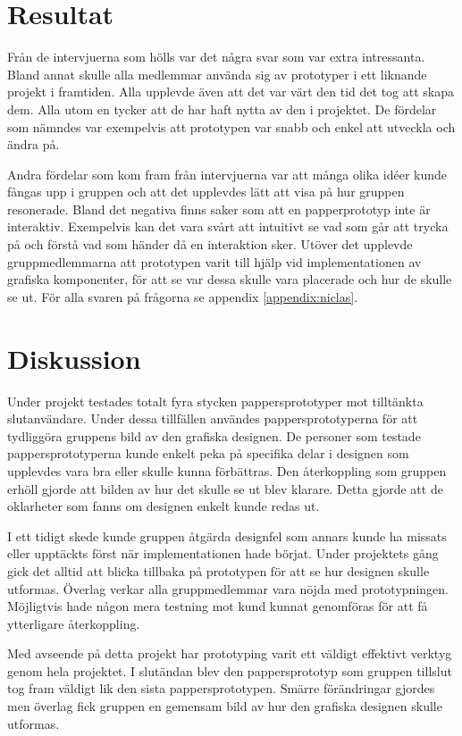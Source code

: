 \section{Resultat}
Från de intervjuerna som hölls var det några svar som var extra intressanta. Bland annat skulle alla medlemmar använda sig av prototyper i ett liknande projekt i framtiden. Alla upplevde även att det var värt den tid det tog att skapa dem. Alla utom en tycker att de har haft nytta av den i projektet. De fördelar som nämndes var exempelvis att prototypen var snabb och enkel att utveckla och ändra på. 

Andra fördelar som kom fram från intervjuerna var att många olika idéer kunde fångas upp i gruppen och att det upplevdes lätt att visa på hur gruppen resonerade. Bland det negativa finns saker som att en papperprototyp inte är interaktiv. Exempelvis kan det vara svårt att intuitivt se vad som går att trycka på och förstå vad som händer då en interaktion sker. Utöver det upplevde gruppmedlemmarna att prototypen varit till hjälp vid implementationen av grafiska komponenter, för att se var dessa skulle vara placerade och hur de skulle se ut. För alla svaren på frågorna se appendix \ref{appendix:niclas}.  
  
\section{Diskussion}
Under projekt testades totalt fyra stycken pappersprototyper mot tilltänkta slutanvändare. Under dessa tillfällen användes pappersprototyperna för att tydliggöra gruppens bild av den grafiska designen. De personer som testade pappersprototyperna kunde enkelt peka på specifika delar i designen som upplevdes vara bra eller skulle kunna förbättras. Den återkoppling som gruppen erhöll gjorde att bilden av hur det skulle se ut blev klarare. Detta gjorde att de oklarheter som fanns om designen enkelt kunde redas ut. 

I ett tidigt skede kunde gruppen åtgärda designfel som annars kunde ha missats eller upptäckts först när implementationen hade börjat. Under projektets gång gick det alltid att blicka tillbaka på prototypen för att se hur designen skulle utformas. Överlag verkar alla gruppmedlemmar vara nöjda med prototypningen. Möjligtvis hade någon mera testning mot kund kunnat genomföras för att få ytterligare återkoppling. 

Med avseende på detta projekt har prototyping varit ett väldigt effektivt verktyg genom hela projektet. I slutändan blev den pappersprototyp som gruppen tillslut tog fram väldigt lik den sista pappersprototypen. Smärre förändringar gjordes men överlag fick gruppen en gemensam bild av hur den grafiska designen skulle utformas.    

